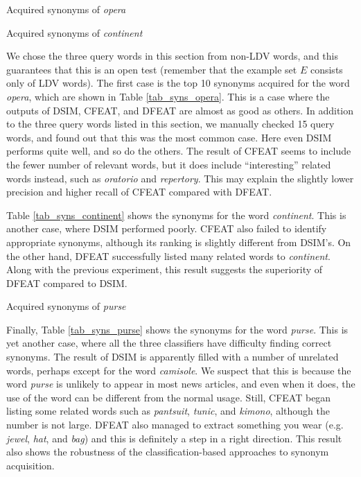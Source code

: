 \documentclass[english]{jnlp_1.4}
\begin{document}
\begin{table}[b]
 \begin{minipage}[t]{.49\textwidth}
  \caption{Acquired synonyms of \textit{opera}}
  \label{tab_syns_opera}

 \end{minipage}
 \hfill
 \begin{minipage}[t]{.49\textwidth}
  \caption{Acquired synonyms of \textit{continent}}
  \label{tab_syns_continent}

 \end{minipage}
\end{table}

We chose the three query words in this section from non-LDV words, and
this guarantees that this is an open test (remember that the example
set $E$ consists only of LDV words). The first case is the top 10
synonyms acquired for the word \textit{opera}, which are shown in Table
\ref{tab_syns_opera}.  This is a case where the outputs of DSIM,
CFEAT, and DFEAT are almost as good as others. In addition to the
three query words listed in this section, we manually checked 15 query
words, and found out that this was the most common case. Here even
DSIM performs quite well, and so do the others. The result of CFEAT
seems to include the fewer number of relevant words, but it does
include ``interesting'' related words instead, such as \textit{oratorio}
and \textit{repertory}. This may explain the slightly lower precision and
higher recall of CFEAT compared with DFEAT.


Table \ref{tab_syns_continent} shows the synonyms for the word {\em
continent}.  This is another case, where DSIM performed poorly. CFEAT
also failed to identify appropriate synonyms, although its ranking is
slightly different from DSIM's. On the other hand, DFEAT successfully
listed many related words to \textit{continent}. Along with the previous
experiment, this result suggests the superiority of DFEAT compared to
DSIM.


\begin{table}[t]
\caption{Acquired synonyms of \textit{purse}}
\label{tab_syns_purse}

\end{table}

Finally, Table \ref{tab_syns_purse} shows the synonyms for the word
\textit{purse}.  This is yet another case, where all the three
classifiers have difficulty finding correct synonyms. The result of
DSIM is apparently filled with a number of unrelated words, perhaps
except for the word \textit{camisole}. We suspect that this is because
the word \textit{purse} is unlikely to appear in most news articles, and
even when it does, the use of the word can be different from the
normal usage. Still, CFEAT began listing some related words such as
\textit{pantsuit}, \textit{tunic}, and \textit{kimono}, although the number is
not large. DFEAT also managed to extract something you wear (e.g. {\em
jewel}, \textit{hat}, and \textit{bag}) and this is definitely a step in a
right direction. This result also shows the robustness of the
classification-based approaches to synonym acquisition.
\end{document}
